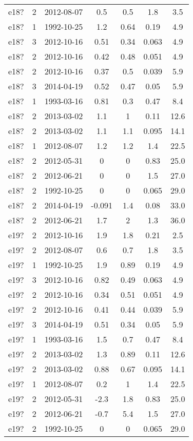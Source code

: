 \begin{table*}[htp]
\begin{tabular}{ccccccc}
e18? & 2 & 2012-08-07 & 0.5 & 0.5 & 1.8 & 3.5 \\
e18? & 1 & 1992-10-25 & 1.2 & 0.64 & 0.19 & 4.9 \\
e18? & 3 & 2012-10-16 & 0.51 & 0.34 & 0.063 & 4.9 \\
e18? & 2 & 2012-10-16 & 0.42 & 0.48 & 0.051 & 4.9 \\
e18? & 2 & 2012-10-16 & 0.37 & 0.5 & 0.039 & 5.9 \\
e18? & 3 & 2014-04-19 & 0.52 & 0.47 & 0.05 & 5.9 \\
e18? & 1 & 1993-03-16 & 0.81 & 0.3 & 0.47 & 8.4 \\
e18? & 2 & 2013-03-02 & 1.1 & 1 & 0.11 & 12.6 \\
e18? & 2 & 2013-03-02 & 1.1 & 1.1 & 0.095 & 14.1 \\
e18? & 1 & 2012-08-07 & 1.2 & 1.2 & 1.4 & 22.5 \\
e18? & 2 & 2012-05-31 & 0 & 0 & 0.83 & 25.0 \\
e18? & 2 & 2012-06-21 & 0 & 0 & 1.5 & 27.0 \\
e18? & 2 & 1992-10-25 & 0 & 0 & 0.065 & 29.0 \\
e18? & 2 & 2014-04-19 & -0.091 & 1.4 & 0.08 & 33.0 \\
e18? & 2 & 2012-06-21 & 1.7 & 2 & 1.3 & 36.0 \\
e19? & 2 & 2012-10-16 & 1.9 & 1.8 & 0.21 & 2.5 \\
e19? & 2 & 2012-08-07 & 0.6 & 0.7 & 1.8 & 3.5 \\
e19? & 1 & 1992-10-25 & 1.9 & 0.89 & 0.19 & 4.9 \\
e19? & 3 & 2012-10-16 & 0.82 & 0.49 & 0.063 & 4.9 \\
e19? & 2 & 2012-10-16 & 0.34 & 0.51 & 0.051 & 4.9 \\
e19? & 2 & 2012-10-16 & 0.41 & 0.44 & 0.039 & 5.9 \\
e19? & 3 & 2014-04-19 & 0.51 & 0.34 & 0.05 & 5.9 \\
e19? & 1 & 1993-03-16 & 1.5 & 0.7 & 0.47 & 8.4 \\
e19? & 2 & 2013-03-02 & 1.3 & 0.89 & 0.11 & 12.6 \\
e19? & 2 & 2013-03-02 & 0.88 & 0.67 & 0.095 & 14.1 \\
e19? & 1 & 2012-08-07 & 0.2 & 1 & 1.4 & 22.5 \\
e19? & 2 & 2012-05-31 & -2.3 & 1.8 & 0.83 & 25.0 \\
e19? & 2 & 2012-06-21 & -0.7 & 5.4 & 1.5 & 27.0 \\
e19? & 2 & 1992-10-25 & 0 & 0 & 0.065 & 29.0 \\

\end{tabular}
\end{table*}
